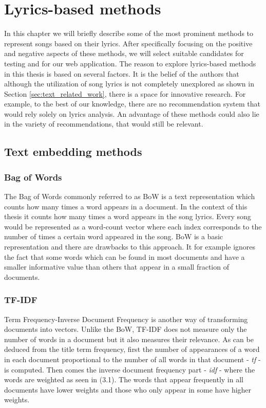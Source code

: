 \chapter{Lyrics-based methods}\label{lyrics_methods}
 In this chapter we will briefly describe some of the most prominent methods to represent songs based on their lyrics. After specifically focusing on the positive and negative aspects of these methods, we will select suitable candidates for testing and for our web application. The reason to explore lyrics-based methods in this thesis is based on several factors. It is the belief of the authors that although the utilization of song lyrics is not completely unexplored as shown in Section \ref{sec:text_related_work}, there is a space for innovative research. For example, to the best of our knowledge, there are no recommendation system that would rely solely on lyrics analysis. An advantage of these methods could also lie in the variety of recommendations, that would still be relevant.

\section{Text embedding methods}
\subsection{Bag of Words}
The Bag of Words commonly referred to as BoW is a text representation which counts how many times a word appears in a document. In the context of this thesis it counts how many times a word appears in the song lyrics.
Every song would be represented as a word-count vector where each index corresponds to the number of times a certain word appeared in the song. BoW is a basic representation and there are drawbacks to this approach. It for example ignores the fact that some words which can be found in most documents and have a smaller informative value than others that appear in a small fraction of documents. 
\subsection{TF-IDF}
Term Frequency-Inverse Document Frequency is another way of transforming documents into vectors. Unlike the BoW, TF-IDF does not measure only the number of words in a document but it also measures their relevance. As can be deduced from the title term frequency, first the number of appearances of a word in each document proportional to the number of all words in that document - \textit{tf} - is computed. Then comes the inverse document frequency part - \textit{idf} - where the words are weighted as seen in (3.1). The words that appear frequently in all documents have lower weights and those who only appear in some have higher weights.

